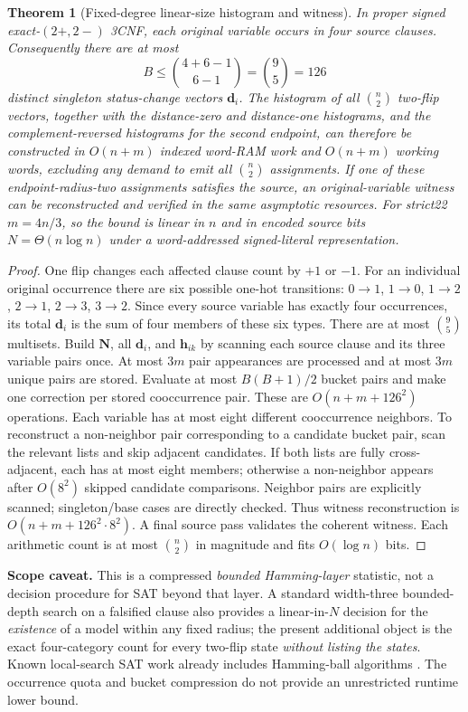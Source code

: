 \documentclass[10pt]{article}
\newtheorem{theorem}{Theorem}
\newcommand{\vN}{\mathbf N}
\newcommand{\bd}{\mathbf d}
\newcommand{\bh}{\mathbf h}
\begin{document}
\begin{theorem}[Fixed-degree linear-size histogram and witness]\label{thm:complexity}
In proper signed exact-$(2+,2-)$ 3CNF, each original variable occurs in four source clauses. Consequently there are at most
\[
\boxed{B\le\binom{4+6-1}{6-1}=\binom95=126}
\]
distinct singleton status-change vectors $\bd_i$. The histogram of all $\binom n2$ two-flip vectors, together with the distance-zero and distance-one histograms, and the complement-reversed histograms for the second endpoint, can therefore be constructed in $O(n+m)$ indexed word-RAM work and $O(n+m)$ working words, excluding any demand to emit all $\binom n2$ assignments. If one of these endpoint-radius-two assignments satisfies the source, an original-variable witness can be reconstructed and verified in the same asymptotic resources. For strict22 $m=4n/3$, so the bound is linear in $n$ and in encoded source bits $N=\Theta(n\log n)$ under a word-addressed signed-literal representation.
\end{theorem}
\begin{proof}
One flip changes each affected clause count by $+1$ or $-1$. For an individual original occurrence there are six possible one-hot transitions: $0\to1$, $1\to0$, $1\to2$, $2\to1$, $2\to3$, $3\to2$. Since every source variable has exactly four occurrences, its total $\bd_i$ is the sum of four members of these six types. There are at most $\binom95$ multisets. Build $\vN$, all $\bd_i$, and $\bh_{ik}$ by scanning each source clause and its three variable pairs once. At most $3m$ pair appearances are processed and at most $3m$ unique pairs are stored. Evaluate at most $B(B+1)/2$ bucket pairs and make one correction per stored cooccurrence pair. These are $O(n+m+126^2)$ operations. Each variable has at most eight different cooccurrence neighbors. To reconstruct a non-neighbor pair corresponding to a candidate bucket pair, scan the relevant lists and skip adjacent candidates. If both lists are fully cross-adjacent, each has at most eight members; otherwise a non-neighbor appears after $O(8^2)$ skipped candidate comparisons. Neighbor pairs are explicitly scanned; singleton/base cases are directly checked. Thus witness reconstruction is $O(n+m+126^2\cdot8^2)$. A final source pass validates the coherent witness. Each arithmetic count is at most $\binom n2$ in magnitude and fits $O(\log n)$ bits.
\end{proof}

\noindent\textbf{Scope caveat.} This is a compressed \emph{bounded Hamming-layer} statistic, not a decision procedure for SAT beyond that layer. A standard width-three bounded-depth search on a falsified clause also provides a linear-in-$N$ decision for the \emph{existence} of a model within any fixed radius; the present additional object is the exact four-category count for every two-flip state \emph{without listing the states}. Known local-search SAT work already includes Hamming-ball algorithms \cite{DantsinHirschWolpert2003}. The occurrence quota and bucket compression do not provide an unrestricted runtime lower bound.
\end{document}
